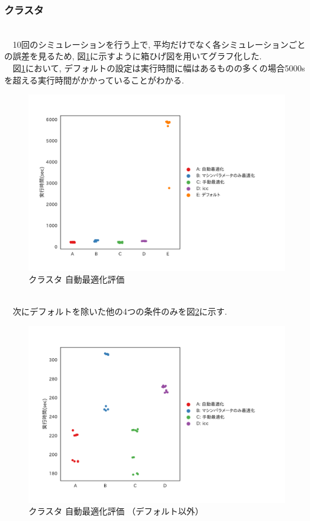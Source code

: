 \subsubsection{クラスタ}~\\
　10回のシミュレーションを行う上で, 平均だけでなく各シミュレーションごとの誤差を見るため,
図\ref{fig:cluster-compare}に示すように箱ひげ図を用いてグラフ化した.\\
　図\ref{fig:cluster-compare}において, デフォルトの設定は実行時間に幅はあるものの多くの場合5000sを超える実行時間がかかっていることがわかる.\\
\begin{figure}[htb]
 \begin{center}
    \includegraphics[width=14cm]{./images/cluster-compare.pdf}
    \caption{クラスタ 自動最適化評価}
    \label{fig:cluster-compare}
  \end{center}
\end{figure}~\\
　次にデフォルトを除いた他の4つの条件のみを図\ref{fig:cluster-compare-2}に示す.\\
\begin{figure}[htb]
 \begin{center}
    \includegraphics[width=14cm]{./images/cluster-compare-2.pdf}
    \caption{クラスタ 自動最適化評価 （デフォルト以外）}
    \label{fig:cluster-compare-2}
  \end{center}
\end{figure}~\\
